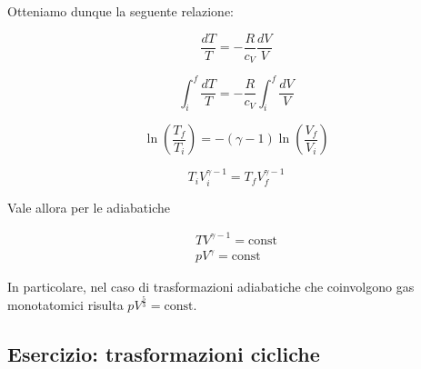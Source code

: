 Otteniamo dunque la seguente relazione:

\[ \frac{dT}{T} = -\frac{R}{c_V}\frac{dV}{V} \]

\[ \int_{i}^{f}\frac{dT}{T} = -\frac{R}{c_V}\int_{i}^{f}\frac{dV}{V} \]

\[ \ln\left( \frac{T_f}{T_i} \right) = -(\gamma - 1)\ln\left(\frac{V_f}{V_i}\right) \]

\[ T_i V_i^{\gamma - 1} = T_fV_f^{\gamma - 1} \]

Vale allora per le adiabatiche

\begin{align}
    TV^{\gamma - 1} = \text{const}\\
    pV^\gamma = \text{const}
\end{align}

In particolare, nel caso di trasformazioni adiabatiche che coinvolgono
gas monotatomici risulta $pV^{\frac53} = \text{const}$.

\subsection{Esercizio: trasformazioni cicliche}
